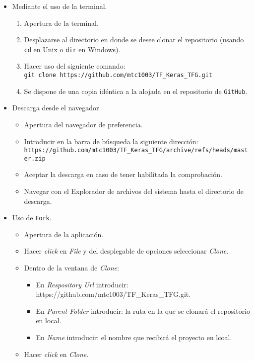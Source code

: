 \begin{itemize}
    \item Mediante el uso de la terminal.
    \begin{enumerate}
    \tightlist
    \item Apertura de la terminal.
    \item Desplazarse al directorio en donde se desee clonar el repositorio (usando \texttt{cd} en Unix o \texttt{dir} en Windows).
    \item Hacer uso del siguiente comando:\\
    \texttt{git clone https://github.com/mtc1003/TF\_Keras\_TFG.git}
    \item Se dispone de una copia idéntica a la alojada en el repositorio de \texttt{GitHub}.
    \end{enumerate}
    
    \item Descarga desde el navegador.
    \begin{itemize}
    \tightlist
    \item Apertura del navegador de preferencia.
    \item Introducir en la barra de búsqueda la siguiente dirección:\\
    \texttt{https://github.com/mtc1003/TF\_Keras\_TFG/archive/refs/heads/master.zip}
    \item Aceptar la descarga en caso de tener habilitada la comprobación.
    \item Navegar con el Explorador de archivos del sistema hasta el directorio de descarga.
    \end{itemize}

    \item Uso de \texttt{Fork}.
    \begin{itemize}
    \tightlist
    \item Apertura de la aplicación.
    \item Hacer \textit{click} en \textit{File} y del desplegable de opciones seleccionar \textit{Clone}.
    \item Dentro de la ventana de \textit{Clone}:
    \begin{itemize}
    \item En \textit{Respository Url} introducir:\\ https://github.com/mtc1003/TF\_Keras\_TFG.git.
    \item En \textit{Parent Folder} introducir: la ruta en la que se clonará el repositorio en local.
    \item En \textit{Name} introducir: el nombre que recibirá el proyecto en lcoal.
    \end{itemize}
    \item Hacer \textit{click} en \textit{Clone}.
    \end{itemize}
\end{itemize}

